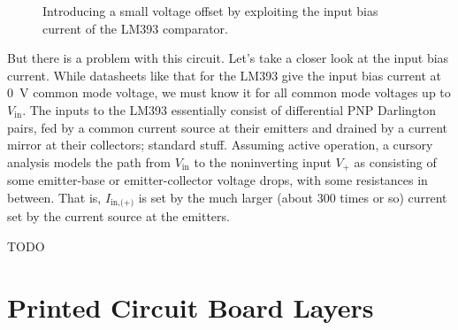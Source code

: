 \documentclass[letterpaper,twocolumn,10pt]{article}
\begin{document}
\begin{figure}
  \centering
  \caption{Introducing a small voltage offset by exploiting the input bias
  current of the LM393 comparator.}
  \label{fig:biasoff}
\end{figure}

But there is a problem with this circuit. Let's take a closer look at the input
bias current. While datasheets like that for the LM393 give the input bias
current at \SI{0}{\V} common mode voltage, we must know it for all common mode
voltages up to $V_$. The inputs to the LM393 essentially consist of
differential PNP Darlington pairs, fed by a common current source at their
emitters and drained by a current mirror at their collectors; standard stuff.
Assuming active operation, a cursory analysis models the path from $V_$
to the noninverting input $V_+$ as consisting of some emitter-base or
emitter-collector voltage drops, with some resistances in between. That is,
$I_$ is set by the much larger (about 300 times or so) current set
by the current source at the emitters.

TODO

\clearpage



\section{Printed Circuit Board Layers}
\end{document}

